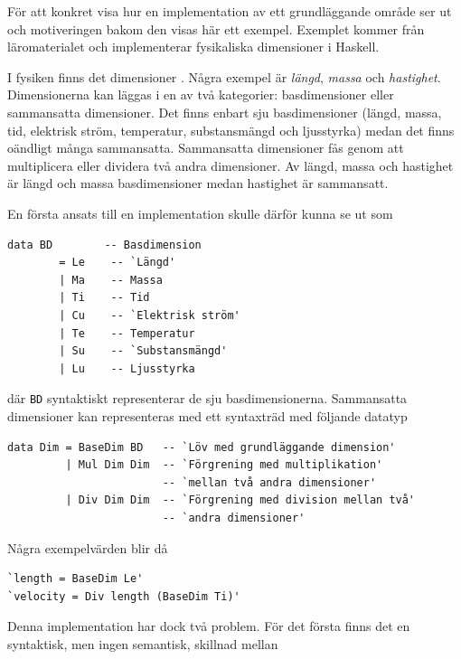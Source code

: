 För att konkret visa hur en implementation av ett grundläggande område ser ut
och motiveringen bakom den visas här ett exempel. Exemplet kommer från
läromaterialet och implementerar fysikaliska dimensioner i Haskell.

I fysiken finns det dimensioner \cite{dimensioner_ne}. Några exempel är \textit{längd},
\textit{massa} och \textit{hastighet}. Dimensionerna kan läggas i en av två
kategorier: basdimensioner eller sammansatta dimensioner. Det finns enbart sju 
basdimensioner (längd, massa, tid, elektrisk ström, temperatur, substansmängd och
ljusstyrka) medan det finns oändligt många sammansatta. Sammansatta
dimensioner fås genom att multiplicera eller dividera två andra dimensioner. Av längd, massa och hastighet är längd och massa basdimensioner medan hastighet är sammansatt.

En första ansats till en implementation skulle därför kunna se ut som

\begin{lstlisting}[frame=none, belowskip=-0.5\baselineskip, xleftmargin=0.5in]
 data BD        -- Basdimension
        = Le    -- `Längd'
        | Ma    -- Massa
        | Ti    -- Tid
        | Cu    -- `Elektrisk ström'
        | Te    -- Temperatur
        | Su    -- `Substansmängd'
        | Lu    -- Ljusstyrka
\end{lstlisting}

där \texttt{BD} syntaktiskt representerar de sju basdimensionerna.
Sammansatta dimensioner kan representeras med ett syntaxträd med följande datatyp

\begin{lstlisting}[frame=none, belowskip=-0.5\baselineskip, xleftmargin=0.5in]
data Dim = BaseDim BD   -- `Löv med grundläggande dimension'
         | Mul Dim Dim  -- `Förgrening med multiplikation'
                        -- `mellan två andra dimensioner'
         | Div Dim Dim  -- `Förgrening med division mellan två'
                        -- `andra dimensioner'
\end{lstlisting}

Några exempelvärden blir då

\begin{lstlisting}[frame=none, belowskip=-0.5\baselineskip, xleftmargin=0.5in]
`length = BaseDim Le'
`velocity = Div length (BaseDim Ti)'
\end{lstlisting}

Denna implementation har dock två problem. För det första finns det en
syntaktisk, men ingen semantisk, skillnad mellan

